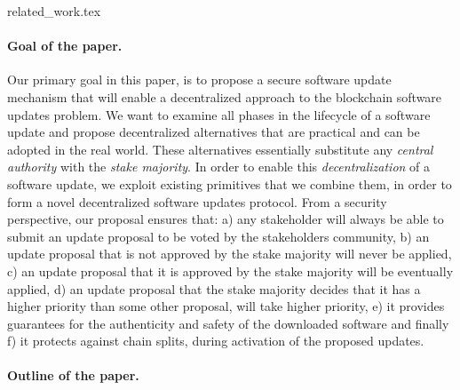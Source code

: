 
{related_work.tex}

\paragraph{Goal of the paper.} Our primary goal in this paper, is to propose a secure software update mechanism that will enable a decentralized approach to the blockchain software updates problem. We want to examine all phases in the lifecycle of a software update and propose decentralized alternatives that are practical and can be adopted in the real world. These alternatives essentially substitute any \emph{central authority} with the \emph{stake majority}. In order to enable this \emph{decentralization} of a software update, we exploit existing primitives that we combine them, in order to form a novel decentralized software updates protocol. From a security perspective, our proposal ensures that:
a) any stakeholder will always be able to submit an update proposal to be voted by the stakeholders community, b) an update proposal that is not approved by the stake majority
 will never be applied, c) an update proposal that it is approved by the stake majority will be eventually applied, d) an update proposal that the stake majority decides that it has a higher priority than some other proposal, will take higher priority, e) it provides guarantees for the authenticity and safety of the downloaded software and finally f) it protects against chain splits, during activation of the proposed updates.

\paragraph{Outline of the paper.}
